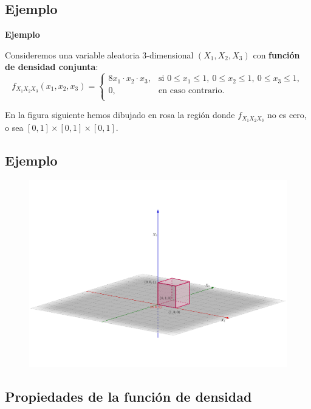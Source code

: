 \documentclass[]{book}
\begin{document}
\hypertarget{ejemplo-97}{%
\subsection{Ejemplo}\label{ejemplo-97}}

\textbf{Ejemplo}

Consideremos una variable aleatoria \(3\)-dimensional \((X_1,X_2,X_3)\) con \textbf{función de densidad conjunta}:
\[
f_{X_1X_2X_3}(x_1,x_2,x_3)=\begin{cases}
8 x_1\cdot x_2\cdot x_3, & \mbox{si }0\leq x_1\leq 1,\ 0\leq x_2\leq 1,\ 0\leq x_3\leq 1, \\
0, & \mbox{en caso contrario.}\\
\end{cases}
\]

En la figura siguiente hemos dibujado en rosa la región donde \(f_{X_1X_2X_3}\) no es cero, o sea \([0,1]\times [0,1]\times [0,1]\).

\hypertarget{ejemplo-98}{%
\subsection{Ejemplo}\label{ejemplo-98}}

\begin{figure}
\includegraphics[width=900px]{Images/Cubo3D2} \end{figure}

\hypertarget{propiedades-de-la-funciuxf3n-de-densidad-3}{%
\subsection{Propiedades de la función de densidad}\label{propiedades-de-la-funciuxf3n-de-densidad-3}}
\end{document}
